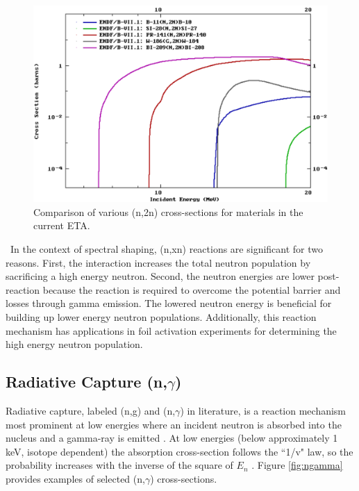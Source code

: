 \begin{figure}[ht]
	\includegraphics[width=\linewidth]{Figures/Chapter2/n2n.png}
	\caption[Comparison of various (n,2n) cross-sections for materials in the current ETA.]{Comparison of various (n,2n) cross-sections for materials in the current ETA\cite{ENDF}.}
	\label{fig:n2n}
\end{figure}

\ In the context of spectral shaping, (n,xn) reactions are significant for two reasons. 
First, the interaction increases the total neutron population by sacrificing a high energy neutron. 
Second, the neutron energies are lower post-reaction because the reaction is required to overcome the potential barrier and losses through gamma emission. 
The lowered neutron energy is beneficial for building up lower energy neutron populations. 
Additionally, this reaction mechanism has applications in foil activation experiments for determining the high energy neutron population.  

\subsection{Radiative Capture (n,$\gamma$)}

Radiative capture, labeled (n,g) and (n,$\gamma$) in literature, is a reaction mechanism most prominent at low energies where an incident neutron is absorbed into the nucleus and a gamma-ray is emitted \cite{Krane}. 
At low energies (below approximately 1 keV, isotope dependent) the absorption cross-section follows the ``1/v" law, so the probability increases with the inverse of the square of $E_{n}$ \cite{Turner}. 
Figure \ref{fig:ngamma} provides examples of selected (n,$\gamma$) cross-sections. 

